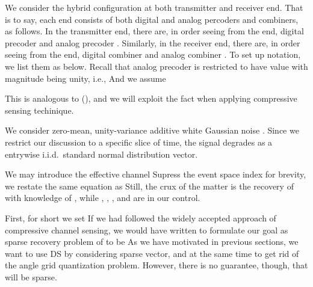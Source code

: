 We consider the hybrid configuration at both transmitter and receiver end.
That is to say, each end consists of both digital and analog percoders and combiners, as follows.
In the transmitter end, there are, in order seeing from the end, digital precoder  and analog precoder .
Similarly, in the receiver end, there are, in order seeing from the end, digital combiner  and analog combiner .
To set up notation, we list them as below.
Recall that analog precoder is restricted to have value with magnitude being unity, i.e.,
And we assume

This is analogous to (), and we will exploit the fact when applying compressive sensing techinique.

We consider zero-mean, unity-variance additive white Gaussian noise .
Since we restrict our discussion to a specific slice of time, the signal  degrades as a entrywise i.i.d.\ standard normal distribution vector.

We may introduce the effective channel
Supress the event space index for brevity, we restate the same equation as
Still, the crux of the matter is the recovery of  with knowledge of , while , , , and  are in our control.

\stopsection
\startsection [title={Proposed Method}]
\startsubsection [title={Vectorization}]

First, for short we set
If we had followed the widely accepted approach of compressive channel sensing, we would have written
to formulate our goal as sparse recovery problem of  to be
As we have motivated in previous sections, we want to use DS by considering sparse vector, and at the same time to get rid of the angle grid quantization problem.
However, there is no guarantee, though, that  will be sparse.

